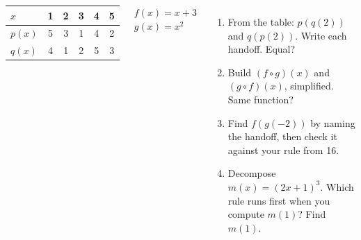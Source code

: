 \documentclass[aspectratio=169, 11pt]{beamer}
\begin{document}
\begin{frame}[t, plain]

  \begin{columns}[T, onlytextwidth]
      \begin{center}
      \renewcommand{\arraystretch}{1.3}
      \begin{tabular}{|l|c|c|c|c|c|}
      \hline
      \(x\) & 1 & 2 & 3 & 4 & 5 \\
      \hline
      \(p(x)\) & 5 & 3 & 1 & 4 & 2 \\
      \hline
      \(q(x)\) & 4 & 1 & 2 & 5 & 3 \\
      \hline
      \end{tabular}
      \end{center}

      \medskip
      \begin{center}
        \(f(x) = x + 3\) \qquad \(g(x) = x^2\)
      \end{center}

      \begin{enumerate}\setlength{\itemsep}{7pt}
        \setcounter{enumi}{14}
        \item From the table: \(p(q(2))\) and \(q(p(2))\). Write each handoff. Equal?
        \item Build \((f \circ g)(x)\) and \((g \circ f)(x)\), simplified. Same function?
        \item Find \(f(g(-2))\) by naming the handoff, then check it against your rule from 16.
        \item Decompose \(m(x) = (2x+1)^3\). Which rule runs first when you compute \(m(1)\)?
              Find \(m(1)\).
      \end{enumerate}
  \end{columns}
\end{frame}
\end{document}
